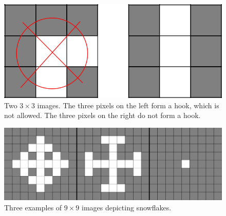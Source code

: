 \begin{figure}[h]
    \centering
    \includegraphics[scale=0.2]{crook_example.png}
    \caption{Two $3 \times 3$ images. The three pixels on the left form a hook, which is not allowed. The three pixels on the right do not form a hook.}
    \label{fig:enter-label}
\end{figure}

\begin{centering}
    \begin{figure}[h]
        \centering
        \includegraphics[scale=0.1]{all_valid_examples.png}
        \caption{Three examples of $9 \times 9$ images depicting snowflakes.}
        \label{fig:enter-label}
    \end{figure}
\end{centering}

